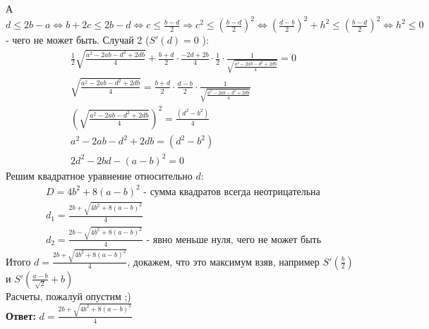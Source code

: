 А $d\leq 2b-a\Leftrightarrow b+2c \leq 2b -d \Leftrightarrow c \leq \frac{b -d}{2} \Rightarrow c^2 \leq \left(\frac{b -d}{2}\right)^2 \Leftrightarrow \left(\frac{d-b}{2}\right)^2+h^2 \leq \left(\frac{b -d}{2}\right)^2 \Leftrightarrow h^2 \leq 0$ - чего не может быть. 
\newpage
\noindent Случай 2 ($S'(d) = 0$ ): \\
\begin{gather*}
    \frac{1}{2} \sqrt{\frac{a^2-2ab-d^2+2db}{4}} + \frac{b+d}{2} \cdot \frac{-2d+2b}{4} \cdot \frac{1}{2} \cdot \frac{1}{\sqrt{\frac{a^2-2ab-d^2+2db}{4}}} = 0 \\
    \sqrt{\frac{a^2-2ab-d^2+2db}{4}} = \frac{b+d}{2} \cdot \frac{d-b}{2} \cdot \frac{1}{\sqrt{\frac{a^2-2ab-d^2+2db}{4}}} \\
    \left(\sqrt{\frac{a^2-2ab-d^2+2db}{4}}\right)^2 = \frac{(d^2-b^2)}{4}\\
    a^2-2ab-d^2+2db= (d^2-b^2)\\
    2d^2-2bd-(a-b)^2=0
\end{gather*}
Решим квадратное уравнение относительно $d$:
\begin{gather*}
    D = 4b^2+8(a-b)^2 \text{ - сумма квадратов всегда неотрицательна}\\
    d_1 = \frac{2b+\sqrt{4b^2+8(a-b)^2}}{4}\\
    d_2 = \frac{2b-\sqrt{4b^2+8(a-b)^2}}{4} \text{ - явно меньше нуля, чего не может быть}
\end{gather*}
Итого $d = \frac{2b+\sqrt{4b^2+8(a-b)^2}}{4}$, докажем, что это максимум взяв, например $S'\left(\frac{b}{2}\right)$ и $S'\left(\frac{a-b}{\sqrt{2}}+b\right)$ \\
Расчеты, пожалуй опустим ;)\\
{\bf Ответ:} $d = \frac{2b+\sqrt{4b^2+8(a-b)^2}}{4}$
